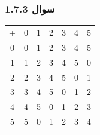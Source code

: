 \documentclass{article}
\begin{document}
\subsubsection{سوال 1.7.3}
\begin{latin}
\begin{table}[H]
\centering
\begin{tabular}{ccccccc}
+                      & 0                      & 1                      & 2                      & 3                      & 4                      & 5                      \\ \cline{2-7} 
\multicolumn{1}{c|}{0} & \multicolumn{1}{c|}{0} & \multicolumn{1}{c|}{1} & \multicolumn{1}{c|}{2} & \multicolumn{1}{c|}{3} & \multicolumn{1}{c|}{4} & \multicolumn{1}{c|}{5} \\ \cline{2-7} 
\multicolumn{1}{c|}{1} & \multicolumn{1}{c|}{1} & \multicolumn{1}{c|}{2} & \multicolumn{1}{c|}{3} & \multicolumn{1}{c|}{4} & \multicolumn{1}{c|}{5} & \multicolumn{1}{c|}{0} \\ \cline{2-7} 
\multicolumn{1}{c|}{2} & \multicolumn{1}{c|}{2} & \multicolumn{1}{c|}{3} & \multicolumn{1}{c|}{4} & \multicolumn{1}{c|}{5} & \multicolumn{1}{c|}{0} & \multicolumn{1}{c|}{1} \\ \cline{2-7} 
\multicolumn{1}{c|}{3} & \multicolumn{1}{c|}{3} & \multicolumn{1}{c|}{4} & \multicolumn{1}{c|}{5} & \multicolumn{1}{c|}{0} & \multicolumn{1}{c|}{1} & \multicolumn{1}{c|}{2} \\ \cline{2-7} 
\multicolumn{1}{c|}{4} & \multicolumn{1}{c|}{4} & \multicolumn{1}{c|}{5} & \multicolumn{1}{c|}{0} & \multicolumn{1}{c|}{1} & \multicolumn{1}{c|}{2} & \multicolumn{1}{c|}{3} \\ \cline{2-7} 
\multicolumn{1}{c|}{5} & \multicolumn{1}{c|}{5} & \multicolumn{1}{c|}{0} & \multicolumn{1}{c|}{1} & \multicolumn{1}{c|}{2} & \multicolumn{1}{c|}{3} & \multicolumn{1}{c|}{4} \\ \cline{2-7} 
\end{tabular}
\end{table}
\end{latin}
\end{document}
